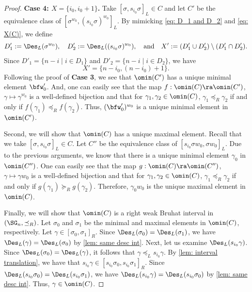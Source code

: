 \documentclass[12pt, reqno]{amsart}
\theoremstyle{definition}
\numberwithin{equation}{section} \numberwithin{figure}{section}
\numberwithin{table}{section}
\begin{document}
\begin{proof}
{\bf Case 4: $X = \{i_0, i_0 + 1\}$.}
Take $[\sigma, s_{i_0} \sigma]_L \in C$ and let $C'$ be the equivalence class of $[\sigma^{w_0}, (s_{i_0} \sigma)^{w_0}]_L$.
By mimicking \cref{eq: D_1 and D_2} and \cref{eq: X(C)},  
we define 
\[
D'_1 := \Des_L(\sigma^{w_0}), 
\quad 
D'_2 := \Des_L((s_{i_0}\sigma)^{w_0}), 
\quad \text{and} \quad
X' := (D'_1 \cup D'_2) \setminus (D'_1 \cap D'_2).
\]
Since 
$D'_1 = \{
n-i \mid i \in D_1\}$ and $D'_2 = \{
n-i \mid i \in D_2\}$,
we have
\[
X' =  \{n-i_0, (n-i_0)+1\}.
\]
Following the proof of {\bf Case 3}, we see that  $\omin(C')$ has a unique minimal element $\bfw'_0$.
And, one can easily see that the map $f: \omin(C) \ra \omin(C')$, $\gamma \mapsto \gamma^{w_0}$ is a well-defined bijection and that for $\gamma_1, \gamma_2 \in \omin(C)$, $\gamma_1 \preceq_R \gamma_2$ if and only if $f(\gamma_1) \preceq_R f(\gamma_2)$.
Thus, $(\bfw'_0)^{w_0}$ is a unique minimal element in $\omin(C')$.
\medskip

Second, we will show that $\omin(C)$ has a unique maximal element.
Recall that we take $[\sigma, s_{i_0} \sigma]_L \in C$.
Let $C''$ be the equivalence class of $[s_{i_0} \sigma w_0, \sigma w_0]_L$.
Due to the previous arguments, we know that there is a unique minimal element $\gamma_0$ in $\omin(C'')$.
One can easily see that the map $g: \omin(C) \ra \omin(C'')$, $\gamma \mapsto \gamma w_0$ is a well-defined bijection and that for $\gamma_1, \gamma_2 \in \omin(C)$, $\gamma_1 \preceq_R \gamma_2$ if and only if $g(\gamma_1) \succeq_R g(\gamma_2)$.
Therefore, $\gamma_0 w_0$ is the unique maximal element in $\omin(C)$.

\medskip
Finally, we will show that  $\omin(C)$ is a right weak Bruhat interval in $(\SG_n, \preceq_R)$.
Let $\sigma_0$ and $\sigma_1$ be the minimal and maximal elements in $\omin(C)$, respectively.
Let $\gamma \in [\sigma_0, \sigma_1]_R$.
Since $\Des_L(\sigma_0) = \Des_L(\sigma_1)$,  we have
$\Des_L(\gamma) = \Des_L(\sigma_0)$ by \cref{lem: same desc int}.
Next, let us examine $\Des_L(s_{i_0}\gamma)$.
Since $\Des_L(\sigma_0) = \Des_L(\gamma)$,
it follows that $\gamma \preceq_L s_{i_0} \gamma$.
By \cref{lem: interval translation}, we have that $s_{i_0} \gamma \in [s_{i_0}\sigma_0, s_{i_0}\sigma_1]_{R}$.
Since $\Des_L(s_{i_0} \sigma_0) =\Des_L(s_{i_0} \sigma_1)$, we have $\Des_L(s_{i_0}\gamma) = \Des_L(s_{i_0}\sigma_0)$ by \cref{lem: same desc int}.
Thus, $\gamma \in \omin(C)$.
\end{proof}
\end{document}
